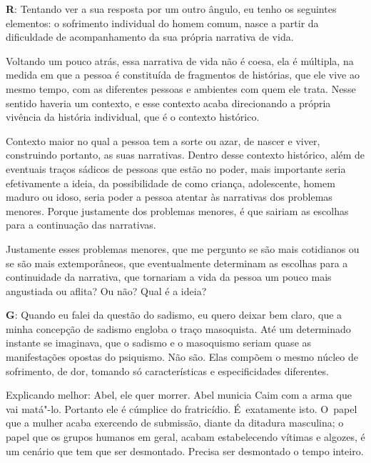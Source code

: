  

\textbf{R}: Tentando ver a sua resposta por um outro ângulo, eu tenho os
seguintes elementos: o sofrimento individual do homem comum, nasce a
partir da dificuldade de acompanhamento da sua própria narrativa de
vida.

 

Voltando um pouco atrás, essa narrativa de vida não é coesa, ela é
múltipla, na medida em que a pessoa é constituída de fragmentos de
histórias, que ele vive ao mesmo tempo, com as diferentes pessoas e
ambientes com quem ele trata. Nesse sentido haveria um contexto, e esse
contexto acaba direcionando a própria vivência da história individual,
que é o contexto histórico.

 

Contexto maior no qual a pessoa tem a sorte ou azar, de nascer e viver,
construindo portanto, as suas narrativas. Dentro desse contexto
histórico, além de eventuais traços sádicos de pessoas que estão no
poder, mais importante seria efetivamente a ideia, da possibilidade de
como criança, adolescente, homem maduro ou idoso, seria poder a pessoa
atentar às narrativas dos problemas menores. Porque justamente dos
problemas menores, é que sairiam as escolhas para a continuação das
narrativas.

 

Justamente esses problemas menores, que me pergunto se são mais
cotidianos ou se são mais extemporâneos, que eventualmente determinam as
escolhas para a continuidade da narrativa, que tornariam a vida da
pessoa um pouco mais angustiada ou aflita? Ou não? Qual é a ideia?

 

\textbf{G}: Quando eu falei da questão do sadismo, eu quero deixar bem
claro, que a minha concepção de sadismo engloba o traço masoquista. Até
um determinado instante se imaginava, que o sadismo e o masoquismo
seriam quase as manifestações opostas do psiquismo. Não são. Elas
compõem o mesmo núcleo de sofrimento, de dor, tomando só características
e especificidades diferentes.

 

Explicando melhor: Abel, ele quer morrer. Abel municia Caim com a arma
que vai matá"-lo. Portanto ele é cúmplice do fratricídio. É~exatamente
isto. O~papel que a mulher acaba exercendo de submissão, diante da
ditadura masculina; o papel que os grupos humanos em geral, acabam
estabelecendo vítimas e algozes, é um cenário que tem que ser
desmontado. Precisa ser desmontado o tempo inteiro.

